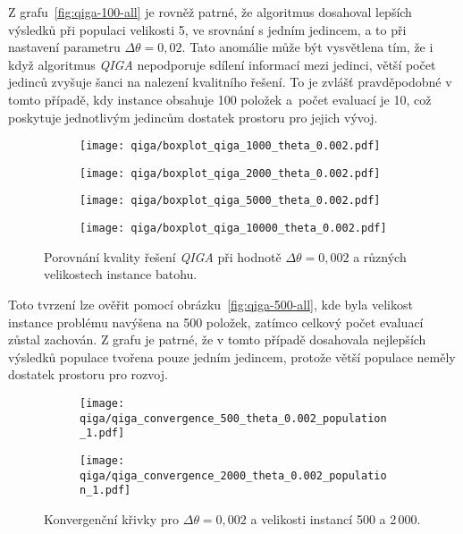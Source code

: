 Z grafu~\ref{fig:qiga-100-all} je rovněž patrné, že algoritmus dosahoval lepších výsledků při populaci velikosti 5, ve srovnání s jedním jedincem, a to při nastavení parametru $\Delta\theta = 0,02$.  
Tato anomálie může být vysvětlena tím, že i když algoritmus \emph{QIGA} nepodporuje sdílení informací mezi jedinci, větší počet jedinců zvyšuje šanci na nalezení kvalitního řešení. 
To je zvlášť pravděpodobné v tomto případě, kdy instance obsahuje 100 položek a~počet evaluací je 10, což poskytuje jednotlivým jedincům dostatek prostoru pro jejich vývoj. 

\begin{figure}[h!]
    \centering
    \begin{subfigure}[b]{0.24\textwidth}
      \texttt{[image: qiga/boxplot\_qiga\_1000\_theta\_0.002.pdf]}
    \end{subfigure}
    \hfill
    \begin{subfigure}[b]{0.24\textwidth}
        \texttt{[image: qiga/boxplot\_qiga\_2000\_theta\_0.002.pdf]}
    \end{subfigure}
    \hfill
    \begin{subfigure}[b]{0.24\textwidth}
        \texttt{[image: qiga/boxplot\_qiga\_5000\_theta\_0.002.pdf]}
    \end{subfigure}
    \hfill
    \begin{subfigure}[b]{0.24\textwidth}
        \texttt{[image: qiga/boxplot\_qiga\_10000\_theta\_0.002.pdf]}
    \end{subfigure}
  
    \caption{Porovnání kvality řešení \emph{QIGA} při hodnotě $\Delta\theta = 0,002$ a různých velikostech instance batohu.}
    \label{fig:qiga-large}
\end{figure}

Toto tvrzení lze ověřit pomocí obrázku~\ref{fig:qiga-500-all}, kde byla velikost instance problému navýšena na 500 položek, zatímco celkový počet evaluací zůstal zachován. 
Z grafu je patrné, že v tomto případě dosahovala nejlepších výsledků populace tvořena pouze jedním jedincem, protože větší populace neměly dostatek prostoru pro rozvoj.

\begin{figure}[h!]
    \centering
    \begin{subfigure}[b]{0.48\textwidth}
      \texttt{[image: qiga/qiga\_convergence\_500\_theta\_0.002\_population\_1.pdf]}
    \end{subfigure}
    \hfill
    \begin{subfigure}[b]{0.48\textwidth}
        \texttt{[image: qiga/qiga\_convergence\_2000\_theta\_0.002\_population\_1.pdf]}
    \end{subfigure}
    \caption{Konvergenční křivky pro $\Delta\theta = 0,002$ a velikosti instancí 500 a 2\,000.}
    \label{fig:qiga-convergence}
\end{figure}

